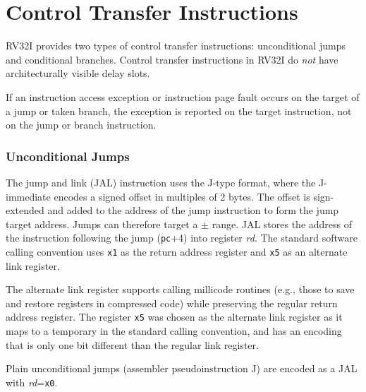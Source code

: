 \section{Control Transfer Instructions}

RV32I provides two types of control transfer instructions:
unconditional jumps and conditional branches.  Control transfer
instructions in RV32I do {\em not} have architecturally visible delay
slots.

If an instruction access exception or instruction page fault occurs on the
target of a jump or taken branch, the exception is reported on the target
instruction, not on the jump or branch instruction.

\subsubsection*{Unconditional Jumps}

\vspace{-0.1in} The jump and link (JAL) instruction uses the J-type
format, where the J-immediate encodes a signed offset in multiples of
2 bytes.  The offset is sign-extended and added to the address of
the jump instruction
to form the jump target address.  Jumps can therefore target a
$\pm$ range. JAL stores the address of the instruction
following the jump ({\tt pc}+4) into register {\em rd}.  The standard
software calling convention uses {\tt x1} as the return address
register and {\tt x5} as an alternate link register.

\begin{commentary}
The alternate link register supports calling millicode routines (e.g.,
those to save and restore registers in compressed code) while
preserving the regular return address register.  The register {\tt x5}
was chosen as the alternate link register as it maps to a temporary in
the standard calling convention, and has an encoding that is only one
bit different than the regular link register.
\end{commentary}

Plain unconditional jumps (assembler pseudoinstruction J) are encoded as a JAL
with {\em rd}={\tt x0}.

